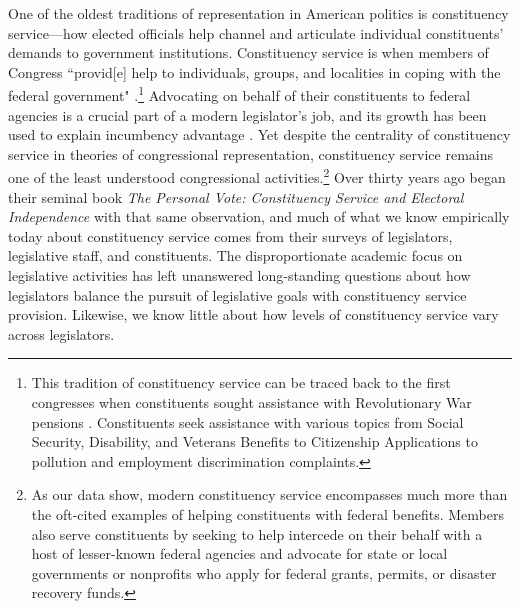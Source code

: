 \documentclass[12pt]{article}
\begin{document}
One of the oldest traditions of representation in American politics is constituency service---how elected officials help channel and articulate individual constituents' demands to government institutions. Constituency service is when members of Congress ``provid[e] help to individuals, groups, and localities in coping with the federal government" \citep{Fenno1978}.\footnote{This tradition of constituency service can be traced back to the first congresses when constituents sought assistance with Revolutionary War pensions \citep{Eckman2017}. Constituents seek assistance with various topics from Social Security, Disability, and Veterans Benefits to Citizenship Applications to pollution and employment discrimination complaints.} Advocating on behalf of their constituents to federal agencies is a crucial part of a modern legislator's job, and its growth has been used to explain incumbency advantage \citep{King1991}. Yet despite the centrality of constituency service in theories of congressional representation, constituency service remains one of the least understood congressional activities.\footnote{As our data show, modern constituency service encompasses much more than the oft-cited examples of helping constituents with federal benefits. Members also serve constituents by seeking to help intercede on their behalf with a host of lesser-known federal agencies and advocate for state or local governments or nonprofits who apply for federal grants, permits, or disaster recovery funds.} Over thirty years ago \citet*{CainFerejohnFiorina1987} began their seminal book \textit{The Personal Vote: Constituency Service and Electoral Independence} with that same observation, and much of what we know empirically today about constituency service comes from their surveys of legislators, legislative staff, and constituents. The disproportionate academic focus on legislative activities has left unanswered long-standing questions about how legislators balance the pursuit of legislative goals with constituency service provision. Likewise, we know little about how levels of constituency service vary across legislators. 



\end{document}
